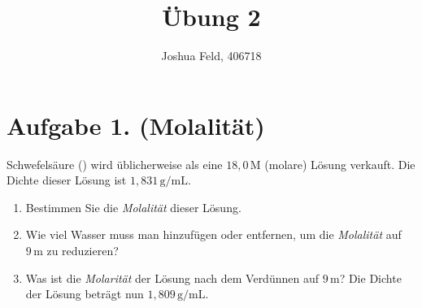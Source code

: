 \documentclass[german,12pt]{homework}
\title{Übung 2}
\author{Joshua Feld, 406718}
\institute{RWTH Aachen University\\Aachener Verfahrenstechnik}
\newcommand{\sis}[1]{\,\si{#1}}
\begin{document}
    \maketitle

    \section*{Aufgabe 1. (Molalität)}

    \begin{problem}
        Schwefelsäure () wird üblicherweise als eine
        \(18,0\sis{\mega}\) (molare) Lösung verkauft. Die Dichte dieser
        Lösung ist \(1,831\sis{\gram\per\milli\liter}\).
        \begin{enumerate}
            \item Bestimmen Sie die \emph{Molalität} dieser Lösung.
            \item Wie viel Wasser muss man hinzufügen oder entfernen, um die
            \emph{Molalität} auf \(9\sis{\milli}\) zu reduzieren?
            \item Was ist die \emph{Molarität} der Lösung nach dem Verdünnen auf
            \(9\sis{\milli}\)? Die Dichte der Lösung beträgt nun
            \(1,809\sis{\gram\per\milli\liter}\).
        \end{enumerate}
    \end{problem}
\end{document}
